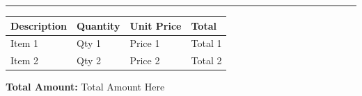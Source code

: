 \documentclass[12pt,a4paper]{article}
\begin{document}
\vspace{0.5cm}

\rule{\textwidth}{0.75pt}

\vspace{0.5cm}

\begin{minipage}[t]{\textwidth}
    \begin{tabularx}{\textwidth}{|X|X|X|X|}
        \hline
        Description & Quantity & Unit Price & Total   \\
        \hline
        Item 1      & Qty 1    & Price 1    & Total 1 \\
        Item 2      & Qty 2    & Price 2    & Total 2 \\
        \hline
    \end{tabularx}
\end{minipage}


\begin{flushright}
    \textbf{Total Amount: } Total Amount Here \\
\end{flushright}
\end{document}
